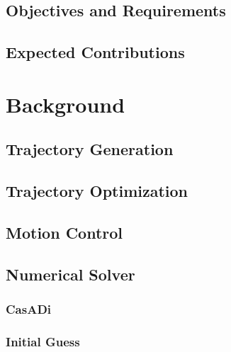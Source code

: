 \documentclass[a4paper, oneside]{article}
\begin{document}
    \subsection{Objectives and Requirements}
    \label{sec:Introduction:Objectives and Requirments}
    

    \subsection{Expected Contributions}
    \label{sec:Introduction:Contributions}
    

\clearpage
\section{Background}
    \subsection{Trajectory Generation}
    \label{sec:Background:Trajectory Generation}
    

    \subsection{Trajectory Optimization}
    \label{sec:Background:Trajectory Optimization}
    

    \subsection{Motion Control}
    \label{sec:Background:Motion Control}
    

    \subsection{Numerical Solver}
    \subsubsection{CasADi}
    \label{sec:Background:Numerical Solver:Casadi}
    

    \subsubsection{Initial Guess}
    \label{sec:Background:Numerical Solver:Initial guess}
    
\end{document}
